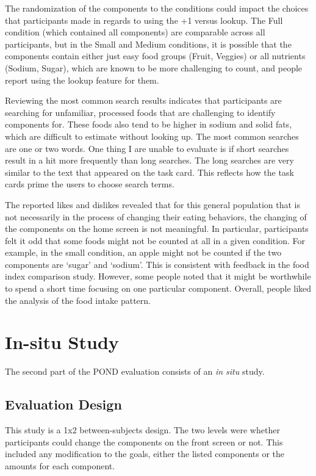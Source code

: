 The randomization of the components to the conditions could impact the choices that participants made in regards to using the +1 versus lookup. The Full condition (which contained all components) are comparable across all participants, but in the Small and Medium conditions, it is possible that the components contain either just easy food groups (Fruit, Veggies) or all nutrients (Sodium, Sugar), which are known to be more challenging to count, and people report using the lookup feature for them.

Reviewing the most common search results indicates that participants are searching for unfamiliar, processed foods that are challenging to identify components for. These foods also tend to be higher in sodium and solid fats, which are difficult to estimate without looking up. The most common searches are one or two words. One thing I are unable to evaluate is if  short searches result in a hit more frequently than long searches. The long searches are very similar to the text that appeared on the task card. This reflects how the task cards prime the users to choose search terms. 

The reported likes and dislikes revealed that for this general population that is not necessarily in the process of changing their eating behaviors, the changing of the components on the home screen is not meaningful. In particular, participants felt it odd that some foods might not be counted at all in a given condition. For example, in the small condition, an apple might not be counted if the two components are `sugar' and `sodium'. This is consistent with feedback in the food index comparison study. However, some people noted that it might be worthwhile to spend a short time focusing on one particular component. Overall, people liked the analysis of the food intake pattern. 

\section{In-situ Study}

The second part of the POND evaluation consists of an \textit{in situ} study. 

\subsection{Evaluation Design}
This study is a 1x2 between-subjects design. The two levels were whether participants could change the components on the front screen or not. This included any modification to the goals, either the listed components or the amounts for each component. 

